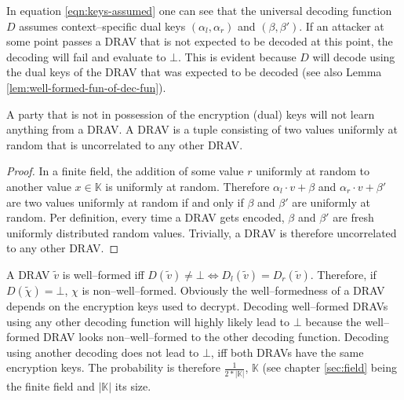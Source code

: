 \noindent{}In equation \ref{eqn:keys-assumed} one can see that the universal
decoding function $D$ assumes context--specific  dual keys $(\alpha_l,
\alpha_r)$ and $(\beta, \beta')$. If an attacker at some point passes a DRAV
that is not expected to be decoded at this point, the decoding will fail and
evaluate to $\bot$. This is evident because $D$ will decode using the dual keys
of the DRAV that was expected to be decoded (see also Lemma
\ref{lem:well-formed-fun-of-dec-fun}).

\begin{lem}
  \label{lem:DRAV-random}

  A party that is not in possession of the encryption (dual) keys will not learn
  anything from a DRAV\@. A DRAV is a tuple consisting of two values uniformly
  at random that is uncorrelated to any other DRAV\@.

\end{lem}
\begin{proof}

  In a finite field, the addition of some value $r$ uniformly at random to
  another value $x \in \mathbb{K}$ is uniformly at random. Therefore $\alpha_l
  \cdot v + \beta$ and $\alpha_r \cdot v + \beta'$ are two values uniformly at
  random if and only if $\beta$ and $\beta'$ are uniformly at random. Per
  definition, every time a DRAV gets encoded, $\beta$ and $\beta'$ are fresh
  uniformly distributed random values. Trivially, a DRAV is therefore
  uncorrelated to any other DRAV\@.

\end{proof}


\label{sec:well-formed-DRAV}

A DRAV $\widetilde{v}$ is well--formed iff $D(\widetilde{v}) \neq \bot
\Leftrightarrow D_l(\widetilde{v}) = D_r(\widetilde{v})$. Therefore, if
$D(\widetilde{\chi}) = \bot$, $\chi$ is non--well--formed. Obviously the
well--formedness of a DRAV depends on the encryption keys used to decrypt.
Decoding well--formed DRAVs using any other decoding function will highly likely
lead to $\bot$ because the well--formed DRAV looks non--well--formed to the
other decoding function. Decoding using another decoding does not lead to
$\bot$, iff both DRAVs have the same encryption keys. The probability is
therefore $\frac{1}{2*|\mathbb{K}|}$, $\mathbb{K}$ (see chapter \ref{sec:field}
being the finite field and $|\mathbb{K}|$ its size.

